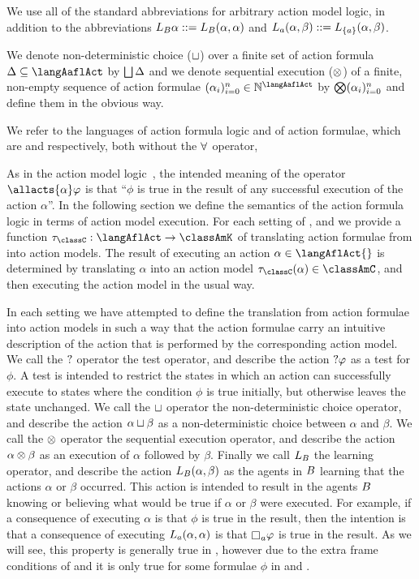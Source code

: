 We use all of the standard abbreviations for arbitrary action model logic, in addition to the abbreviations $L_B \alpha ::= L_B (\alpha, \alpha)$ and $L_a (\alpha, \beta) ::= L_{\{a\}} (\alpha, \beta)$.

We denote non-deterministic choice ($\sqcup$) over a finite set of action formula $\Delta \subseteq \langAaflAct$ by $\bigsqcup \Delta$ and we denote sequential execution ($\otimes$) of a finite, non-empty sequence of action formulae $(\alpha_i)_{i=0}^{n} \in \mathbb{N}^\langAaflAct$ by $\bigotimes (\alpha_i)_{i=0}^{n}$ and define them in the obvious way.

We refer to the languages \langAfl{} of action formula logic and \langAflAct{} of action formulae, which are \langAafl{} and \langAaflAct{} respectively, both without the $\allrefs$ operator, 

As in the action model logic~\cite{baltag:2004}, the intended meaning of the operator $\allacts{\alpha} \phi$ is that ``$\phi$ is true in the result of any successful execution of the action $\alpha$''.
In the following section we define the semantics of the action formula logic in terms of action model execution.
For each setting of \classK{}, \classKFF{} and \classS{} we provide a function $\tau_\classC : \langAflAct \to \classAmK$ of translating action formulae from \langAflAct{} into action models.
The result of executing an action $\alpha \in \langAflAct{}$ is determined by translating $\alpha$ into an action model $\tau_\classC(\alpha) \in \classAmC$, and then executing the action model in the usual way.

In each setting we have attempted to define the translation from action formulae into action models in such a way that the action formulae carry an intuitive description of the action that is performed by the corresponding action model.
We call the $?{}$ operator the test operator, and describe the action $?{\varphi}$ as a test for $\phi$.
A test is intended to restrict the states in which an action can successfully execute to states where the condition $\phi$ is true initially, but otherwise leaves the state unchanged. 
We call the $\sqcup$ operator the non-deterministic choice operator, and describe the action $\alpha \sqcup \beta$ as a non-deterministic choice between $\alpha$ and $\beta$.
We call the $\otimes$ operator the sequential execution operator, and describe the action $\alpha \otimes \beta$ as an execution of $\alpha$ followed by $\beta$. 
Finally we call $L_B$ the learning operator, and describe the action $L_B (\alpha, \beta)$ as the agents in $B$ learning that the actions $\alpha$ or $\beta$ occurred.
This action is intended to result in the agents $B$ knowing or believing what would be true if $\alpha$ or $\beta$ were executed.
For example, if a consequence of executing $\alpha$ is that $\phi$ is true in the result, then the intention is that a consequence of executing $L_a (\alpha, \alpha)$ is that $\knows_\agentA \phi$ is true in the result.
As we will see, this property is generally true in \logicAflK{}, however due to the extra frame conditions of \classKFF{} and \classS{} it is only true for some formulae $\phi$ in \logicAflKFF{} and \logicAflS{}.

